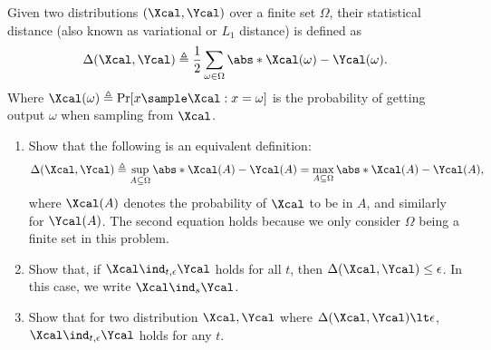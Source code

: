 \begin{problem}\label{p1}
    \leavevmode\par
    Given two distributions $(\Xcal, \Ycal)$ over a finite set $\Omega$, their statistical distance (also known as variational or $L_1$ distance) is defined as
    \[
        \Delta(\Xcal, \Ycal)\triangleq \frac{1}{2}\sum_{\omega\in\Omega}\abs*{\Xcal(\omega)-\Ycal(\omega)}.
    \]
    Where $\Xcal(\omega)\triangleq \Pr[x\sample \Xcal: x=\omega]$  is the probability of getting output $\omega$ when sampling from $\Xcal$.
    \begin{enumerate}[label=(\roman*)]
        \item Show that the following is an equivalent definition:
        \[
            \Delta(\Xcal, \Ycal)\triangleq \sup_{A\subseteq \Omega}\abs*{\Xcal(A)-\Ycal(A)}
            = \max_{A\subseteq \Omega}\abs*{\Xcal(A)-\Ycal(A)},
        \]
        where $\Xcal(A)$ denotes the probability of $\Xcal$ to be in $A$, and similarly for $\Ycal(A)$. The second equation holds because we only consider $\Omega$ being a finite set in this problem.
        \item Show that, if $\Xcal \ind_{t,\epsilon} \Ycal$ holds for all $t$, then $\Delta(\Xcal,\Ycal)\le \epsilon$. In this case, we write $\Xcal \ind_{s} \Ycal$.
        \item Show that for two distribution $\Xcal, \Ycal$ where $\Delta(\Xcal,\Ycal)\lt \epsilon$, $\Xcal \ind_{t,\epsilon} \Ycal$ holds for any $t$.
    \end{enumerate}
\end{problem}



